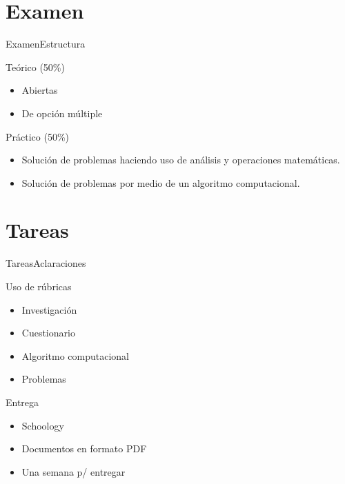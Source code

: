 \documentclass[10pt]{beamer}
\begin{document}
\section{Examen}
\begin{frame}{Examen}{Estructura}
\begin{block}{Teórico (50\%)}
    \begin{itemize}
        \item Abiertas
        \item De opción múltiple
    \end{itemize}
\end{block}

\begin{block}{Práctico (50\%)}
    \begin{itemize}
        \item Solución de problemas haciendo uso de análisis y operaciones matemáticas.
        \item Solución de problemas por medio de un algoritmo computacional.
    \end{itemize}
\end{block}

\end{frame}

\section{Tareas}
\begin{frame}{Tareas}{Aclaraciones}
\begin{block}{Uso de rúbricas}
    \begin{itemize}
        \item Investigación
        \item Cuestionario
        \item Algoritmo computacional
        \item Problemas
    \end{itemize}
\end{block}

\begin{block}{Entrega}
    \begin{itemize}
        \item Schoology
        \item Documentos en formato PDF
        \item Una semana p/ entregar
    \end{itemize}
\end{block}

\end{frame}
\end{document}
